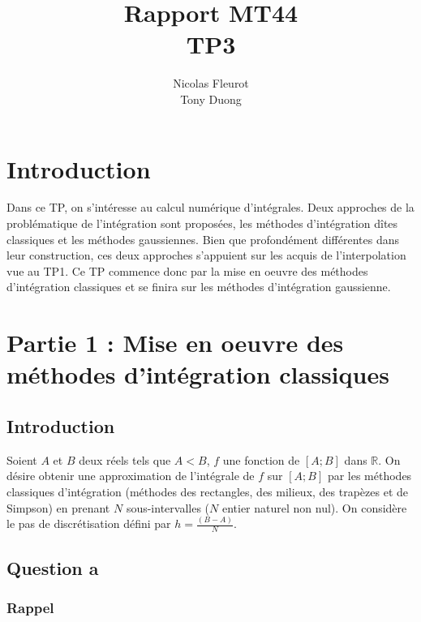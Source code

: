 \documentclass[a4paper,10pt]{report}
\title{Rapport MT44\\\huge{TP3}}
\author{Nicolas Fleurot\\Tony Duong}
\newcommand{\R}{\mathbb{R}}
\begin{document}
\maketitle

\tableofcontents

\chapter*{Introduction}

Dans ce TP, on s’intéresse au calcul numérique d’intégrales. Deux approches de la problématique de l’intégration sont proposées, les méthodes d’intégration dîtes classiques et les méthodes gaussiennes. Bien que profondément différentes dans leur construction, ces deux approches s’appuient sur les acquis de l’interpolation vue au TP1. Ce TP commence donc par la mise en oeuvre des méthodes d’intégration classiques et se finira sur les méthodes d’intégration gaussienne.


\chapter*{Partie 1 : Mise en oeuvre des méthodes d'intégration classiques}

\section*{Introduction}

Soient $A$ et $B$ deux réels tels que $A < B$, $f$ une fonction de $[A;B]$ dans $\R$. On désire obtenir une approximation de l'intégrale de $f$ sur $[A;B]$ par les méthodes  classiques d'intégration (méthodes des rectangles, des milieux, des trapèzes et de   Simpson) en prenant $N$ sous-intervalles ($N$ entier naturel non nul). On considère le    pas de discrétisation défini par $h = \frac{(B - A)}{N}$.

\section*{Question a}

\subsection*{Rappel}
\end{document}
